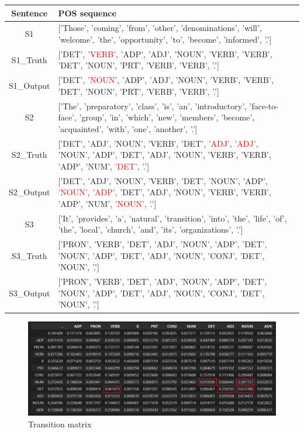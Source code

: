 \documentclass{article}
\begin{document}
\begin{tabular}{cp{12cm}c}
\centering
Sentence & POS sequence \\\hline
S1 & ['Those', 'coming', 'from', 'other', 'denominations', 'will', 'welcome', 'the', 'opportunity', 'to', 'become', 'informed', '.'] \\
S1\_Truth & ['DET', \textcolor{red}{'VERB'}, 'ADP', 'ADJ', 'NOUN', 'VERB', 'VERB', 'DET', 'NOUN', 'PRT', 'VERB', 'VERB', '.'] \\
S1\_Output & ['DET', \textcolor{red}{'NOUN'}, 'ADP', 'ADJ', 'NOUN', 'VERB', 'VERB', 'DET', 'NOUN', 'PRT', 'VERB', 'VERB', '.'] \\
S2 & ['The', 'preparatory', 'class', 'is', 'an', 'introductory', 'face-to-face', 'group', 'in', 'which', 'new', 'members', 'become', 'acquainted', 'with', 'one', 'another', '.'] \\
S2\_Truth & ['DET', 'ADJ', 'NOUN', 'VERB', 'DET', \textcolor{red}{'ADJ'}, \textcolor{red}{'ADJ'}, 'NOUN', 'ADP', 'DET', 'ADJ', 'NOUN', 'VERB', 'VERB', 'ADP', 'NUM', \textcolor{red}{'DET'}, '.'] \\
S2\_Output & ['DET', 'ADJ', 'NOUN', 'VERB', 'DET', 'NOUN', 'ADP', \textcolor{red}{'NOUN'}, \textcolor{red}{'ADP'}, 'DET', 'ADJ', 'NOUN', 'VERB', 'VERB', 'ADP', 'NUM', \textcolor{red}{'NOUN'}, '.'] \\
S3 & ['It', 'provides', 'a', 'natural', 'transition', 'into', 'the', 'life', 'of', 'the', 'local', 'church', 'and', 'its', 'organizations', '.'] \\
S3\_Truth & ['PRON', 'VERB', 'DET', 'ADJ', 'NOUN', 'ADP', 'DET', 'NOUN', 'ADP', 'DET', 'ADJ', 'NOUN', 'CONJ', 'DET', 'NOUN', '.'] \\
S3\_Output & ['PRON', 'VERB', 'DET', 'ADJ', 'NOUN', 'ADP', 'DET', 'NOUN', 'ADP', 'DET', 'ADJ', 'NOUN', 'CONJ', 'DET', 'NOUN', '.'] \\\hline
\end{tabular}
\newline
\newline
\newline
\newline
\newline
\newline
\newline


\begin{figure}[htp]
    \centering
    \includegraphics[width=16cm]{transition.png}
    \caption{Transition matrix}
\end{figure}
\end{document}
